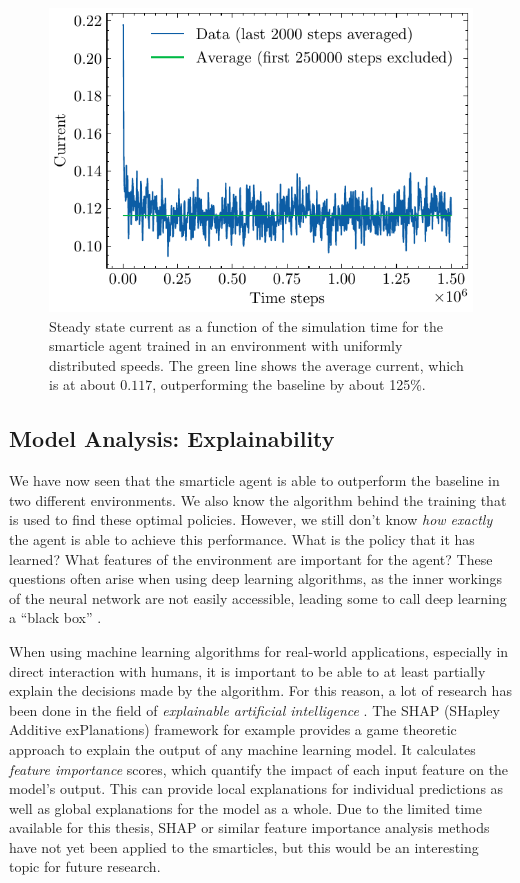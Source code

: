 \begin{figure}[h]
    \centering
    \includegraphics{uniform_speeds.pdf}
    \caption{Steady state current as a function of the simulation time for the smarticle agent trained in an environment with uniformly distributed speeds. The green line shows the average current, which is at about $0.117$, outperforming the baseline by about 125\%.}
    \label{fig:uniform_speeds}
\end{figure}

\subsection{Model Analysis: Explainability}
\label{sec:model_analysis}
We have now seen that the smarticle agent is able to outperform the baseline in two different environments. We also know the algorithm behind the training that is used to find these optimal policies. However, we still don't know \textit{how exactly} the agent is able to achieve this performance. What is the policy that it has learned? What features of the environment are important for the agent? These questions often arise when using deep learning algorithms, as the inner workings of the neural network are not easily accessible, leading some to call deep learning a \enquote{black box} \cite{blazek_blackbox_2022}.


When using machine learning algorithms for real-world applications, especially in direct interaction with humans, it is important to be able to at least partially explain the decisions made by the algorithm. For this reason, a lot of research has been done in the field of \textit{explainable artificial intelligence} \cite{explainable_ai_systematic_2023}. The SHAP (SHapley Additive exPlanations) framework \cite{lundberg_unified_2017, github_shapshap_2024} for example provides a game theoretic approach to explain the output of any machine learning model. It calculates \textit{feature importance} scores, which quantify the impact of each input feature on the model's output. This can provide local explanations for individual predictions as well as global explanations for the model as a whole. Due to the limited time available for this thesis, SHAP or similar feature importance analysis methods have not yet been applied to the smarticles, but this would be an interesting topic for future research.


